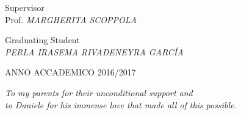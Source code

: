 \begin{titlepage}
\begin{center}
\vspace*{2.75cm}

\begin{minipage}{0.46\textwidth}
\begin{flushleft} 
Supervisor\\
Prof. \textit{MARGHERITA SCOPPOLA}
\end{flushleft}
\end{minipage}
\hfill
\begin{minipage}{0.53\textwidth}
\begin{flushright} 
Graduating Student\\
\textit{PERLA IRASEMA RIVADENEYRA GARC\'{I}A}
\end{flushright}
\end{minipage}

\vspace*{1.5cm}

\begin{large}
ANNO ACCADEMICO 2016/2017
\end{large}

\end{center}
\cleardoublepage
\end{titlepage}

{\pagestyle{empty}

\null{}
\begin{flushright}
\textit{To my parents for their unconditional support and\\ to Daniele for his immense love that made all of this possible.}
\end{flushright}
\null{}

\cleardoublepage}

\frontmatter 

\cleardoublepage
{}
\tableofcontents %

\mainmatter %
